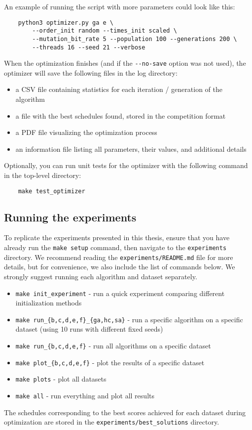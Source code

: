 An example of running the script with more parameters could look like this:
\begin{verbatim}
    python3 optimizer.py ga e \
        --order_init random --times_init scaled \
        --mutation_bit_rate 5 --population 100 --generations 200 \
        --threads 16 --seed 21 --verbose
\end{verbatim}
When the optimization finishes (and if the \verb|--no-save| option was not used), the optimizer will save the following files in the log directory:
\begin{itemize}
    \item a CSV file containing statistics for each iteration / generation of the algorithm
    \item a file with the best schedules found, stored in the competition format
    \item a PDF file visualizing the optimization process
    \item an information file listing all parameters, their values, and additional details
\end{itemize}

\bigskip

Optionally, you can run unit tests for the optimizer with the following command in the top-level directory:
\begin{verbatim}
    make test_optimizer
\end{verbatim}

\subsection{Running the experiments}

To replicate the experiments presented in this thesis, ensure that you have already run the \verb|make setup| command, then navigate to the \verb|experiments| directory. We recommend reading the \verb|experiments/README.md| file for more details, but for convenience, we also include the list of commands below. We strongly suggest running each algorithm and dataset separately.
\begin{itemize}
    \item \verb|make init_experiment| - run a quick experiment comparing different initialization methods
    \item \verb|make run_{b,c,d,e,f}_{ga,hc,sa}| - run a specific algorithm on a specific dataset (using 10 runs with different fixed seeds)
    \item \verb|make run_{b,c,d,e,f}| - run all algorithms on a specific dataset
    \item \verb|make plot_{b,c,d,e,f}| - plot the results of a specific dataset
    \item \verb|make plots| - plot all datasets
    \item \verb|make all| - run everything and plot all results
\end{itemize}

The schedules corresponding to the best scores
achieved for each dataset during optimization are stored in the \verb|experiments/best_solutions| directory.
